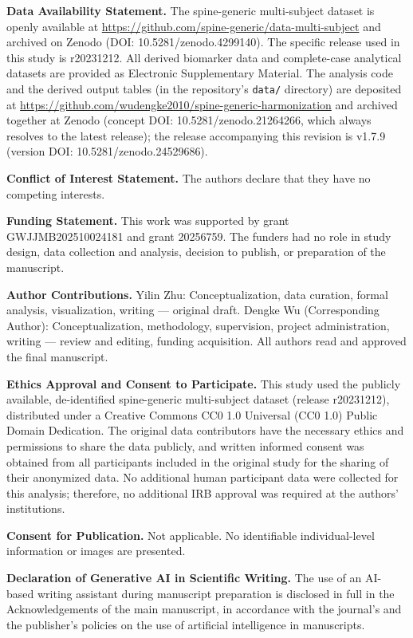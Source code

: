 \documentclass[12pt,a4paper]{article}
\begin{document}
\noindent\textbf{Data Availability Statement.} The spine-generic multi-subject dataset is openly available at \url{https://github.com/spine-generic/data-multi-subject} and archived on Zenodo (DOI: 10.5281/zenodo.4299140). The specific release used in this study is r20231212. All derived biomarker data and complete-case analytical datasets are provided as Electronic Supplementary Material. The analysis code and the derived output tables (in the repository's \texttt{data/} directory) are deposited at \url{https://github.com/wudengke2010/spine-generic-harmonization} and archived together at Zenodo (concept DOI: 10.5281/zenodo.21264266, which always resolves to the latest release); the release accompanying this revision is v1.7.9 (version DOI: 10.5281/zenodo.24529686).

\noindent\textbf{Conflict of Interest Statement.} The authors declare that they have no competing interests.

\noindent\textbf{Funding Statement.} This work was supported by grant GWJJMB202510024181 and grant 20256759. The funders had no role in study design, data collection and analysis, decision to publish, or preparation of the manuscript.

\noindent\textbf{Author Contributions.} Yilin Zhu: Conceptualization, data curation, formal analysis, visualization, writing --- original draft. Dengke Wu (Corresponding Author): Conceptualization, methodology, supervision, project administration, writing --- review and editing, funding acquisition. All authors read and approved the final manuscript.

\noindent\textbf{Ethics Approval and Consent to Participate.} This study used the publicly available, de-identified spine-generic multi-subject dataset (release r20231212), distributed under a Creative Commons CC0 1.0 Universal (CC0 1.0) Public Domain Dedication. The original data contributors have the necessary ethics and permissions to share the data publicly, and written informed consent was obtained from all participants included in the original study for the sharing of their anonymized data. No additional human participant data were collected for this analysis; therefore, no additional IRB approval was required at the authors' institutions.

\noindent\textbf{Consent for Publication.} Not applicable. No identifiable individual-level information or images are presented.

\noindent\textbf{Declaration of Generative AI in Scientific Writing.} The use of an AI-based writing assistant during manuscript preparation is disclosed in full in the Acknowledgements of the main manuscript, in accordance with the journal's and the publisher's policies on the use of artificial intelligence in manuscripts.
\end{document}
